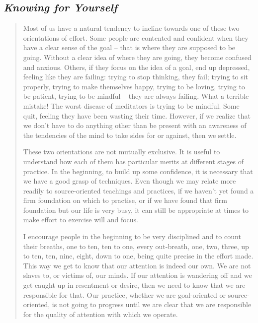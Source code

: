 \hypertarget{knowing-for-yourself}{%
\subsection{\texorpdfstring{\emph{Knowing for
Yourself}}{Knowing for Yourself}}\label{knowing-for-yourself}}

\begin{quote}
Most of us have a natural tendency to incline towards one of these two
orientations of effort. Some people are contented and confident when
they have a clear sense of the goal -- that is where they are supposed
to be going. Without a clear idea of where they are going, they become
confused and anxious. Others, if they focus on the idea of a goal, end
up depressed, feeling like they are failing: trying to stop thinking,
they fail; trying to sit properly, trying to make themselves happy,
trying to be loving, trying to be patient, trying to be mindful -- they
are always failing. What a terrible mistake! The worst disease of
meditators is trying to be mindful. Some quit, feeling they have been
wasting their time. However, if we realize that we don't have to do
anything other than be present with an awareness of the tendencies of
the mind to take sides for or against, then we settle.

These two orientations are not mutually exclusive. It is useful to
understand how each of them has particular merits at different stages of
practice. In the beginning, to build up some confidence, it is necessary
that we have a good grasp of techniques. Even though we may relate more
readily to source-oriented teachings and practices, if we haven't yet
found a firm foundation on which to practise, or if we have found that
firm foundation but our life is very busy, it can still be appropriate
at times to make effort to exercise will and focus.

I encourage people in the beginning to be very disciplined and to count
their breaths, one to ten, ten to one, every out-breath, one, two,
three, up to ten, ten, nine, eight, down to one, being quite precise in
the effort made. This way we get to know that our attention is indeed
our own. We are not slaves to, or victims of, our minds. If our
attention is wandering off and we get caught up in resentment or desire,
then we need to know that we are responsible for that. Our practice,
whether we are goal-oriented or source-oriented, is not going to
progress until we are clear that we are responsible for the quality of
attention with which we operate.


\end{quote}
